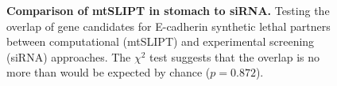 \begin{figure}[!ht]
\begin{mdframed}
  \centering
    \caption[Comparison of mtSLIPT in stomach to siRNA]{\small \textbf{Comparison of mtSLIPT in stomach to siRNA.} Testing the overlap of gene candidates for E-cadherin synthetic lethal partners between computational (mtSLIPT) and experimental screening (siRNA) approaches. The $\chi^2$ test suggests that the overlap is no more than would be expected by chance ($p = 0.872$). %
}
\label{fig:Venn_allgenes_stad_mtSL}
\end{mdframed}
\end{figure}


